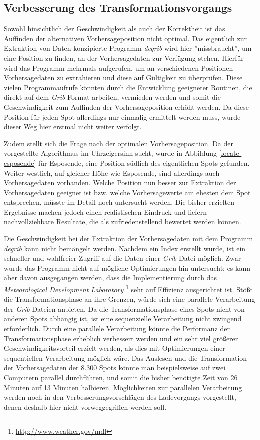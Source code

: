 \subsection{Verbesserung des Transformationsvorgangs}
Sowohl hinsichtlich der Geschwindigkeit als auch der Korrektheit ist
das Auffinden der alternativen Vorhersageposition nicht optimal. Das
eigentlich zur Extraktion von Daten konzipierte Programm
\textit{degrib} wird hier ''missbraucht'', um eine Position zu finden,
an der Vorhersagedaten zur Verfügung stehen. Hierfür wird das Programm
mehrmals aufgerufen, um an verschiedenen Positionen Vorhersagedaten zu
extrahieren und diese auf Gültigkeit zu überprüfen. Diese vielen
Programmaufrufe könnten durch die Entwicklung geeigneter Routinen, die
direkt auf dem \textit{Grib} Format arbeiten, vermieden werden und
somit die Geschwindigkeit zum Auffinden der Vorhersageposition erhöht
werden. Da diese Position für jeden Spot allerdings nur einmalig
ermittelt werden muss, wurde dieser Weg hier erstmal nicht weiter
verfolgt.

Zudem stellt sich die Frage nach der optimalen Vorhersageposition. Da
der vorgestellte Algorithmus im Uhrzeigersinn sucht, wurde in
Abbildung \ref{locate-esposende} für Esposende, eine Position südlich
des eigentlichen Spots gefunden. Weiter westlich, auf gleicher Höhe
wie Esposende, sind allerdings auch Vorhersagedaten vorhanden. Welche
Position nun besser zur Extraktion der Vorhersagedaten geeignet ist
bzw. welche Vorhersagewerte am ehesten dem Spot entsprechen, müsste im
Detail noch untersucht werden. Die bisher erzielten Ergebnisse machen
jedoch einen realistischen Eindruck und liefern nachvollziehbare
Resultate, die als zufriedenstellend bewertet werden können.

Die Geschwindigkeit bei der Extraktion der Vorhersagedaten mit dem
Programm \textit{degrib} kann nicht bemängelt werden. Nachdem ein
Index erstellt wurde, ist ein schneller und wahlfreier Zugriff auf die
Daten einer \textit{Grib}-Datei möglich. Zwar wurde das Programm nicht
auf mögliche Optimierungen hin untersucht; es kann aber davon
ausgegangen werden, dass die Implementierung durch das
\textit{Meteorological Development Laboratory}
\footnote{\url{http://www.weather.gov/mdl}} sehr auf Effizienz
ausgerichtet ist. Stößt die Transformationsphase an ihre Grenzen,
würde sich eine parallele Verarbeitung der \textit{Grib}-Dateien
anbieten. Da die Transformationsphase eines Spots nicht von anderen
Spots abhängig ist, ist eine sequenzielle Verarbeitung nicht zwingend
erforderlich. Durch eine parallele Verarbeitung könnte die Performanz
der Transformationsphase erheblich verbessert werden und ein sehr viel
größerer Geschwindigkeitsvorteil erzielt werden, als dies mit
Optimierungen einer sequentiellen Verarbeitung möglich wäre. Das
Auslesen und die Transformation der Vorhersagedaten der 8.300 Spots
könnte man beispielsweise auf zwei Computern parallel durchführen, und
somit die bisher benötigte Zeit von 26 Minuten auf 13 Minuten
halbieren. Möglichkeiten zur parallelen Verarbeitung werden noch in
den Verbesserungsvorschlägen des Ladevorgangs vorgestellt, denen
deshalb hier nicht vorweggegriffen werden soll.

